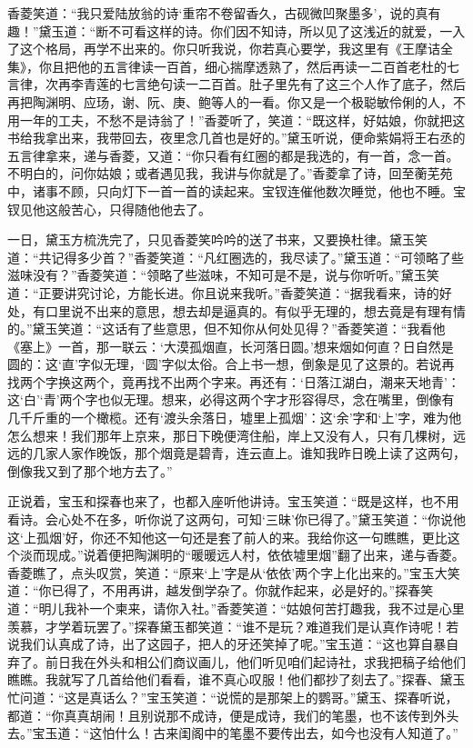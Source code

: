 \documentclass[12pt,oneside]{book}
\begin{document}
香菱笑道：“我只爱陆放翁的诗‘重帘不卷留香久，古砚微凹聚墨多’，说的真有趣！”黛玉道：“断不可看这样的诗。你们因不知诗，所以见了这浅近的就爱，一入了这个格局，再学不出来的。你只听我说，你若真心要学，我这里有《王摩诘全集》，你且把他的五言律读一百首，细心揣摩透熟了，然后再读一二百首老杜的七言律，次再李青莲的七言绝句读一二百首。肚子里先有了这三个人作了底子，然后再把陶渊明、应玚，谢、阮、庚、鲍等人的一看。你又是一个极聪敏伶俐的人，不用一年的工夫，不愁不是诗翁了！”香菱听了，笑道：“既这样，好姑娘，你就把这书给我拿出来，我带回去，夜里念几首也是好的。”黛玉听说，便命紫娟将王右丞的五言律拿来，递与香菱，又道：“你只看有红圈的都是我选的，有一首，念一首。不明白的，问你姑娘；或者遇见我，我讲与你就是了。”香菱拿了诗，回至蘅芜苑中，诸事不顾，只向灯下一首一首的读起来。宝钗连催他数次睡觉，他也不睡。宝钗见他这般苦心，只得随他他去了。

一日，黛玉方梳洗完了，只见香菱笑吟吟的送了书来，又要换杜律。黛玉笑道：“共记得多少首？”香菱笑道：“凡红圈选的，我尽读了。”黛玉道：“可领略了些滋味没有？”香菱笑道：“领略了些滋味，不知可是不是，说与你听听。”黛玉笑道：“正要讲究讨论，方能长进。你且说来我听。”香菱笑道：“据我看来，诗的好处，有口里说不出来的意思，想去却是逼真的。有似乎无理的，想去竟是有理有情的。”黛玉笑道：“这话有了些意思，但不知你从何处见得？”香菱笑道：“我看他《塞上》一首，那一联云：‘大漠孤烟直，长河落日圆。’想来烟如何直？日自然是圆的：这‘直’字似无理，‘圆’字似太俗。合上书一想，倒象是见了这景的。若说再找两个字换这两个，竟再找不出两个字来。再还有：‘日落江湖白，潮来天地青’：这‘白’‘青’两个字也似无理。想来，必得这两个字才形容得尽，念在嘴里，倒像有几千斤重的一个橄榄。还有‘渡头余落日，墟里上孤烟’：这‘余’字和‘上’字，难为他怎么想来！我们那年上京来，那日下晚便湾住船，岸上又没有人，只有几棵树，远远的几家人家作晚饭，那个烟竟是碧青，连云直上。谁知我昨日晚上读了这两句，倒像我又到了那个地方去了。”

正说着，宝玉和探春也来了，也都入座听他讲诗。宝玉笑道：“既是这样，也不用看诗。会心处不在多，听你说了这两句，可知‘三昧’你已得了。”黛玉笑道：“你说他这‘上孤烟’好，你还不知他这一句还是套了前人的来。我给你这一句瞧瞧，更比这个淡而现成。”说着便把陶渊明的“暖暖远人村，依依墟里烟”翻了出来，递与香菱。香菱瞧了，点头叹赏，笑道：“原来‘上’字是从‘依依’两个字上化出来的。”宝玉大笑道：“你已得了，不用再讲，越发倒学杂了。你就作起来，必是好的。”探春笑道：“明儿我补一个柬来，请你入社。”香菱笑道：“姑娘何苦打趣我，我不过是心里羡慕，才学着玩罢了。”探春黛玉都笑道：“谁不是玩？难道我们是认真作诗呢！若说我们认真成了诗，出了这园子，把人的牙还笑掉了呢。”宝玉道：“这也算自暴自弃了。前日我在外头和相公们商议画儿，他们听见咱们起诗社，求我把稿子给他们瞧瞧。我就写了几首给他们看看，谁不真心叹服！他们都抄了刻去了。”探春、黛玉忙问道：“这是真话么？”宝玉笑道：“说慌的是那架上的鹦哥。”黛玉、探春听说，都道：“你真真胡闹！且别说那不成诗，便是成诗，我们的笔墨，也不该传到外头去。”宝玉道：“这怕什么！古来闺阁中的笔墨不要传出去，如今也没有人知道了。”
\end{document}
